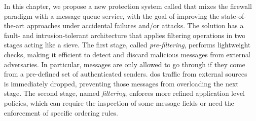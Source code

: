 

In this chapter, we propose a new protection system called \sieveq that mixes the firewall paradigm with a message queue service, with the goal of improving the state-of-the-art approaches under accidental failures and/or attacks.
The solution has a fault- and intrusion-tolerant architecture that applies filtering operations in two stages acting like a sieve.
The first stage, called \emph{pre-filtering}, performs lightweight checks, making it efficient to detect and discard malicious messages from external adversaries.
In particular, messages are only allowed to go through if they come from a pre-defined set of authenticated senders.
\gls{dos} traffic from external sources is immediately dropped, preventing those messages from overloading the next stage.
The second stage, named \emph{filtering}, enforces more refined application level policies, which can require the inspection of some message fields or need the enforcement of specific ordering rules.



